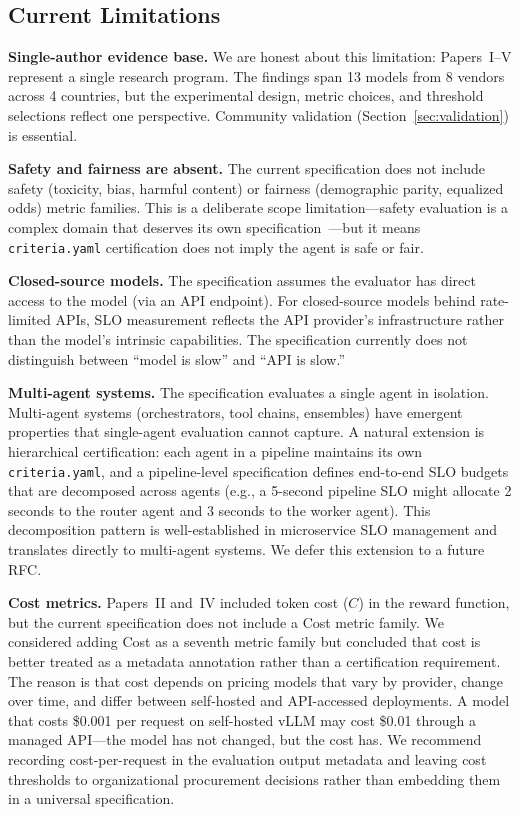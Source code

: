 \documentclass[11pt]{article}
\newcommand{\criteriayaml}{\texttt{criteria.yaml}}
\begin{document}
\subsection{Current Limitations}

\textbf{Single-author evidence base.} We are honest about this limitation: Papers~I--V represent a single research program. The findings span 13 models from 8 vendors across 4 countries, but the experimental design, metric choices, and threshold selections reflect one perspective. Community validation (Section~\ref{sec:validation}) is essential.

\textbf{Safety and fairness are absent.} The current specification does not include safety (toxicity, bias, harmful content) or fairness (demographic parity, equalized odds) metric families. This is a deliberate scope limitation---safety evaluation is a complex domain that deserves its own specification~\citep{weidinger2022taxonomy,bommasani2021foundation}---but it means \criteriayaml{} certification does not imply the agent is safe or fair.

\textbf{Closed-source models.} The specification assumes the evaluator has direct access to the model (via an API endpoint). For closed-source models behind rate-limited APIs, SLO measurement reflects the API provider's infrastructure rather than the model's intrinsic capabilities. The specification currently does not distinguish between ``model is slow'' and ``API is slow.''

\textbf{Multi-agent systems.} The specification evaluates a single agent in isolation. Multi-agent systems (orchestrators, tool chains, ensembles) have emergent properties that single-agent evaluation cannot capture. A natural extension is hierarchical certification: each agent in a pipeline maintains its own \criteriayaml{}, and a pipeline-level specification defines end-to-end SLO budgets that are decomposed across agents (e.g., a 5-second pipeline SLO might allocate 2 seconds to the router agent and 3 seconds to the worker agent). This decomposition pattern is well-established in microservice SLO management and translates directly to multi-agent systems. We defer this extension to a future RFC.

\textbf{Cost metrics.} Papers~II and~IV included token cost ($C$) in the reward function, but the current specification does not include a Cost metric family. We considered adding Cost as a seventh metric family but concluded that cost is better treated as a metadata annotation rather than a certification requirement. The reason is that cost depends on pricing models that vary by provider, change over time, and differ between self-hosted and API-accessed deployments. A model that costs \$0.001 per request on self-hosted vLLM may cost \$0.01 through a managed API---the model has not changed, but the cost has. We recommend recording cost-per-request in the evaluation output metadata and leaving cost thresholds to organizational procurement decisions rather than embedding them in a universal specification.
\end{document}
